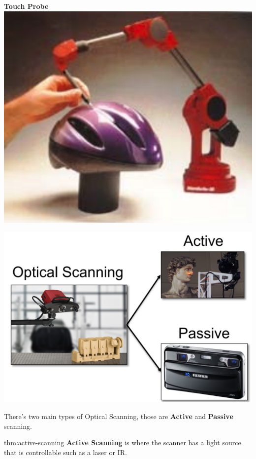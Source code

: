 \documentclass{article}
\begin{document}
\begin{minipage}{0.3\textwidth}
    \centering
    \Large \textbf{Touch Probe}
    \includegraphics[width=0.8\linewidth]{images/touch_probe.png}
\end{minipage}
\begin{minipage}{0.6\textwidth}
    \centering
    \includegraphics[width=0.9\linewidth]{images/optical_scanning.png}
\end{minipage}

\vspace{10px}

There's two main types of Optical Scanning, those are \textbf{Active} and \textbf{Passive} scanning.

\newpage

\begin{defin}{thm:active-scanning}
    \textbf{Active Scanning} is where the scanner has a light source that is controllable such as a laser
    or IR.
\end{defin}
\end{document}
